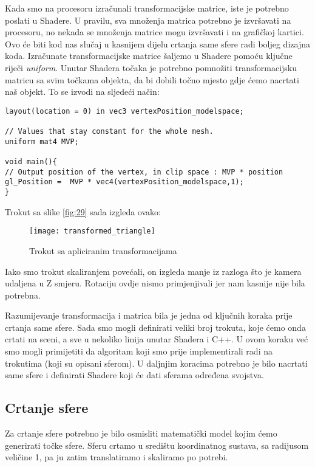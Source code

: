 Kada smo na procesoru izračunali transformacijske matrice, iste je potrebno poslati u Shadere. U pravilu, sva množenja matrica potrebno je izvršavati na procesoru, no nekada se množenja matrice mogu izvršavati i na grafičkoj kartici. Ovo će biti kod nas slučaj u kasnijem dijelu crtanja same sfere radi boljeg dizajna koda. Izračunate transformacijske matrice šaljemo u Shadere pomoću ključne riječi \emph{uniform}. Unutar Shadera točaka je potrebno pomnožiti transformacijsku matricu sa svim točkama objekta, da bi dobili točno mjesto gdje ćemo nacrtati naš objekt. To se izvodi na sljedeći način:
\begin{lstlisting}[style = myC++, label = {code:18}, caption = {Primjer transformacije objekata}]
layout(location = 0) in vec3 vertexPosition_modelspace;

// Values that stay constant for the whole mesh.
uniform mat4 MVP;

void main(){
// Output position of the vertex, in clip space : MVP * position
gl_Position =  MVP * vec4(vertexPosition_modelspace,1);
}

\end{lstlisting}
Trokut sa slike \ref{fig:29} sada izgleda ovako:
\begin{figure}[!http]
	\begin{center}
		\texttt{[image: transformed\_triangle]}
		\caption{Trokut sa apliciranim transformacijama}
		\label{fig:31}
	\end{center}
\end{figure}
Iako smo trokut skaliranjem povećali, on izgleda manje iz razloga što je kamera udaljena u Z smjeru. Rotaciju ovdje nismo primjenjivali jer nam kasnije nije bila potrebna.

Razumijevanje transformacija i matrica bila je jedna od ključnih koraka prije crtanja same sfere. Sada smo mogli definirati veliki broj trokuta, koje ćemo onda crtati na sceni, a sve u nekoliko linija unutar Shadera i C++. U ovom koraku već smo mogli primijetiti da algoritam koji smo prije implementirali radi na trokutima (koji su opisani sferom). U daljnjim koracima potrebno je bilo nacrtati same sfere i definirati Shadere koji će dati sferama određena svojstva.

\subsection{Crtanje sfere}
Za crtanje sfere potrebno je bilo osmisliti matematički model kojim ćemo generirati točke sfere. Sferu crtamo u središtu koordinatnog sustava, sa radijusom veličine 1, pa ju zatim translatiramo i skaliramo po potrebi. 

